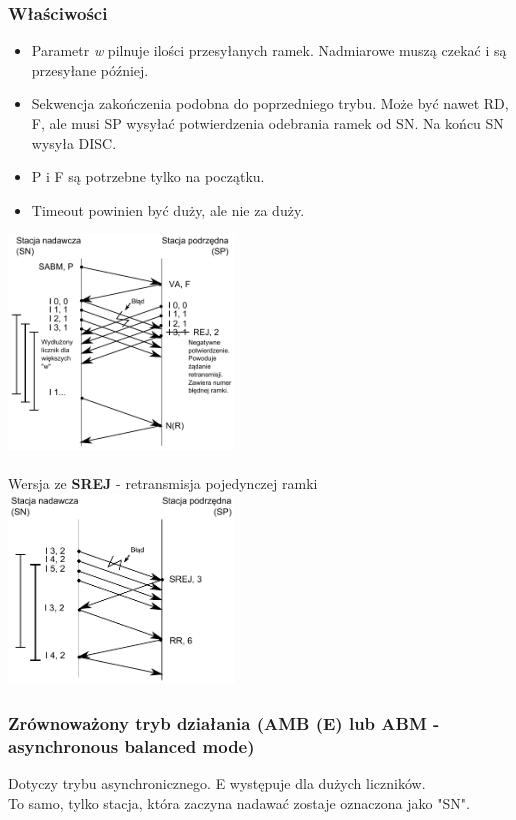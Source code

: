 \documentclass[a4paper,twoside]{article}
\begin{document}
	\subsubsection{Właściwości}
		\begin{itemize}
			\item Parametr \emph{w} pilnuje ilości przesyłanych ramek. Nadmiarowe muszą czekać i są przesyłane później.
			\item Sekwencja zakończenia podobna do poprzedniego trybu. Może być nawet RD, F, ale musi SP wysyłać potwierdzenia odebrania ramek od SN. Na końcu SN wysyła DISC.
			\item P i F są potrzebne tylko na początku.
			\item Timeout powinien być duży, ale nie za duży.
		\end{itemize}
		\includegraphics[width=6cm]{./images/image17.pdf}\\\\
		Wersja ze \textbf{SREJ} - retransmisja pojedynczej ramki\\
		\includegraphics[width=6cm]{./images/image18.pdf}
	\subsubsection{Zrównoważony tryb działania (AMB (E) lub ABM - asynchronous balanced mode)}
		Dotyczy trybu asynchronicznego. E występuje dla dużych liczników.\\
		To samo, tylko stacja, która zaczyna nadawać zostaje oznaczona jako "SN".
\end{document}
